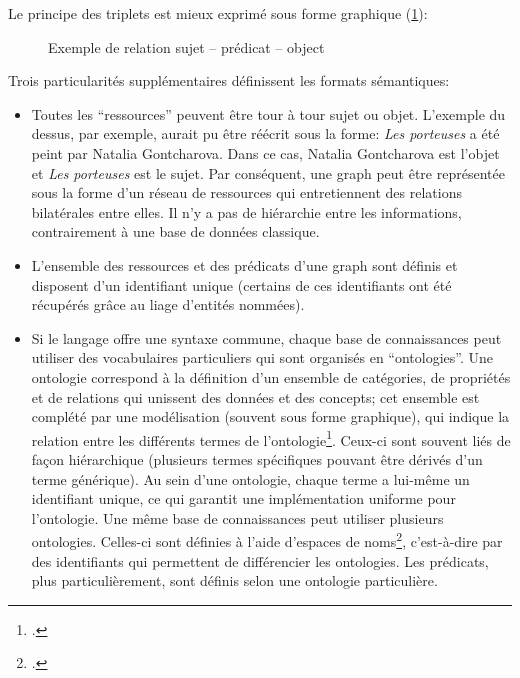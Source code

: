 Le principe des triplets \rdf{} est mieux exprimé sous forme graphique (\ref{fig:triplet}):

\begin{figure}[!h]
	\centering
	\caption{Exemple de relation sujet -- prédicat -- object}
	\label{fig:triplet}
\end{figure}

Trois particularités supplémentaires définissent les formats sémantiques:
\begin{itemize}
	\item Toutes les \enquote{ressources} peuvent être tour à tour sujet ou objet. L'exemple du dessus, par exemple, aurait pu être réécrit sous la forme: \textit{Les porteuses} a été peint par Natalia Gontcharova. Dans ce cas, Natalia Gontcharova est l'objet et \textit{Les porteuses} est le sujet. Par conséquent, une \gls{graph} peut être représentée sous la forme d'un réseau de ressources qui entretiennent des relations bilatérales entre elles. Il n'y a pas de hiérarchie entre les informations, contrairement à une base de données \xml{} classique.
	\item L'ensemble des ressources et des prédicats d'une \gls{graph} sont définis et disposent d'un identifiant unique (certains de ces identifiants ont été récupérés grâce au liage d'entités nommées).
	\item Si le langage \sparql{} offre une syntaxe commune, chaque base de connaissances peut utiliser des vocabulaires particuliers qui sont organisés en \enquote{ontologies}. Une ontologie correspond à la définition d'un ensemble de catégories, de propriétés et de relations qui unissent des données et des concepts; cet ensemble est complété par une modélisation (souvent sous forme graphique), qui indique la relation entre les différents termes de l'ontologie\footcite{noauthor_ontology_2022}. Ceux-ci sont souvent liés de façon hiérarchique (plusieurs termes spécifiques pouvant être dérivés d'un terme générique). Au sein d'une ontologie, chaque terme a lui-même un identifiant unique, ce qui garantit une implémentation uniforme pour l'ontologie. Une même base de connaissances peut utiliser plusieurs ontologies. Celles-ci sont définies à l'aide d'espaces de noms\footcite{noauthor_namespace_2022}, c'est-à-dire par des identifiants qui permettent de différencier les ontologies. Les prédicats, plus particulièrement, sont définis selon une ontologie particulière.
\end{itemize}

